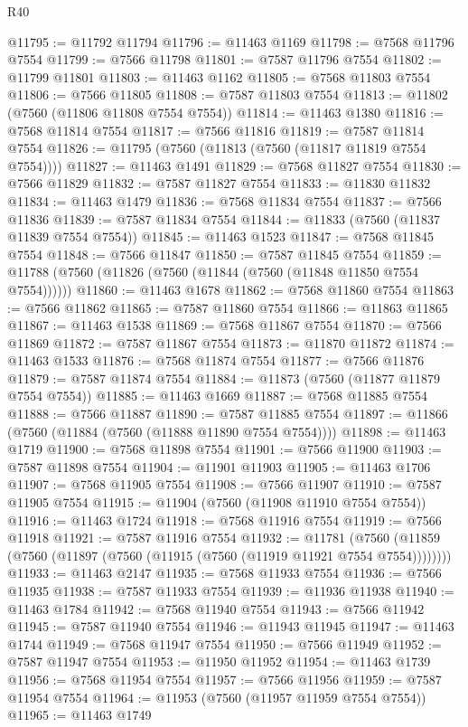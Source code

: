 \begin{lexlean}{R40}
\begin{coremodule}
@11795 := @11792 @11794
@11796 := @11463 @1169
@11798 := @7568 @11796 @7554
@11799 := @7566 @11798
@11801 := @7587 @11796 @7554
@11802 := @11799 @11801
@11803 := @11463 @1162
@11805 := @7568 @11803 @7554
@11806 := @7566 @11805
@11808 := @7587 @11803 @7554
@11813 := @11802 (@7560 (@11806 @11808 @7554 @7554))
@11814 := @11463 @1380
@11816 := @7568 @11814 @7554
@11817 := @7566 @11816
@11819 := @7587 @11814 @7554
@11826 := @11795 (@7560 (@11813 (@7560 (@11817 @11819 @7554 @7554))))
@11827 := @11463 @1491
@11829 := @7568 @11827 @7554
@11830 := @7566 @11829
@11832 := @7587 @11827 @7554
@11833 := @11830 @11832
@11834 := @11463 @1479
@11836 := @7568 @11834 @7554
@11837 := @7566 @11836
@11839 := @7587 @11834 @7554
@11844 := @11833 (@7560 (@11837 @11839 @7554 @7554))
@11845 := @11463 @1523
@11847 := @7568 @11845 @7554
@11848 := @7566 @11847
@11850 := @7587 @11845 @7554
@11859 := @11788 (@7560 (@11826 (@7560 (@11844 (@7560 (@11848 @11850 @7554 @7554))))))
@11860 := @11463 @1678
@11862 := @7568 @11860 @7554
@11863 := @7566 @11862
@11865 := @7587 @11860 @7554
@11866 := @11863 @11865
@11867 := @11463 @1538
@11869 := @7568 @11867 @7554
@11870 := @7566 @11869
@11872 := @7587 @11867 @7554
@11873 := @11870 @11872
@11874 := @11463 @1533
@11876 := @7568 @11874 @7554
@11877 := @7566 @11876
@11879 := @7587 @11874 @7554
@11884 := @11873 (@7560 (@11877 @11879 @7554 @7554))
@11885 := @11463 @1669
@11887 := @7568 @11885 @7554
@11888 := @7566 @11887
@11890 := @7587 @11885 @7554
@11897 := @11866 (@7560 (@11884 (@7560 (@11888 @11890 @7554 @7554))))
@11898 := @11463 @1719
@11900 := @7568 @11898 @7554
@11901 := @7566 @11900
@11903 := @7587 @11898 @7554
@11904 := @11901 @11903
@11905 := @11463 @1706
@11907 := @7568 @11905 @7554
@11908 := @7566 @11907
@11910 := @7587 @11905 @7554
@11915 := @11904 (@7560 (@11908 @11910 @7554 @7554))
@11916 := @11463 @1724
@11918 := @7568 @11916 @7554
@11919 := @7566 @11918
@11921 := @7587 @11916 @7554
@11932 := @11781
    (@7560 (@11859 (@7560 (@11897 (@7560 (@11915 (@7560 (@11919 @11921 @7554 @7554))))))))
@11933 := @11463 @2147
@11935 := @7568 @11933 @7554
@11936 := @7566 @11935
@11938 := @7587 @11933 @7554
@11939 := @11936 @11938
@11940 := @11463 @1784
@11942 := @7568 @11940 @7554
@11943 := @7566 @11942
@11945 := @7587 @11940 @7554
@11946 := @11943 @11945
@11947 := @11463 @1744
@11949 := @7568 @11947 @7554
@11950 := @7566 @11949
@11952 := @7587 @11947 @7554
@11953 := @11950 @11952
@11954 := @11463 @1739
@11956 := @7568 @11954 @7554
@11957 := @7566 @11956
@11959 := @7587 @11954 @7554
@11964 := @11953 (@7560 (@11957 @11959 @7554 @7554))
@11965 := @11463 @1749

\end{coremodule}
\end{lexlean}
